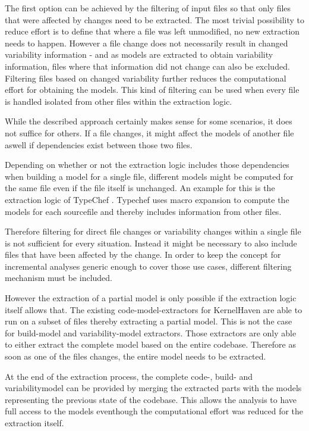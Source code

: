 \documentclass[a4paper]{article}
\begin{document}
The first option can be achieved by the filtering of input files so that only files that were affected by changes need to be extracted. The most trivial possibility to reduce effort is to define that where a file was left unmodified, no new extraction needs to happen. 
However a file change does not necessarily result in changed variability information - and as models are extracted to obtain variability information, files where that information did not change can also be excluded. Filtering files based on changed variability further reduces the computational effort for obtaining the models. This kind of filtering can be used when every file is handled isolated from other files within the extraction logic.

While the described approach certainly makes sense for some scenarios, it does not suffice for others. If a file changes, it might affect the models of another file aswell if dependencies exist between those two files.

Depending on whether or not the extraction logic includes those dependencies when building a model for a single file, different models might be computed for the same file even if the file itself is unchanged. An example for this is the extraction logic of TypeChef \cite{Kenner:2010:TTT:1868688.1868693}. Typechef uses macro expansion to compute the models for each sourcefile and thereby includes information from other files. 

Therefore filtering for direct file changes or variability changes within a single file is not sufficient for every situation. Instead it might be necessary to also include files that have been affected by the change. In order to keep the concept for incremental analyses generic enough to cover those use cases, different filtering mechanism must be included.

However the extraction of a partial model is only possible if the extraction logic itself allows that. The existing code-model-extractors for KernelHaven  are able to run on a subset of files thereby extracting a partial model.  This is not the case for build-model and variability-model extractors. Those extractors are only able to either extract the complete model based on the entire codebase. Therefore as soon as one of the files changes, the entire model needs to be extracted.

At the end of the extraction process, the complete code-, build- and variabilitymodel can be provided by merging the extracted parts with the models representing the previous state of the codebase. This allows the analysis to have full access to the models eventhough the computational effort was reduced for the extraction itself.
\end{document}

